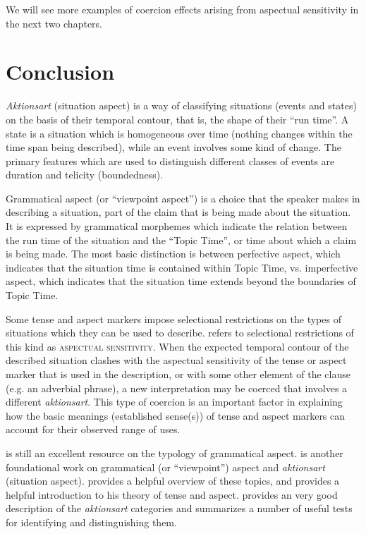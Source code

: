 We will see more examples of coercion effects arising from aspectual sensitivity in the next two chapters.


\section{Conclusion}\label{sec:20.7}

\textit{Aktionsart} (situation aspect) is a way of classifying situations (events and states) on the basis of their temporal contour, that is, the shape of their “run time”. A state is a situation which is homogeneous over time (nothing changes within the time span being described), while an event involves some kind of change. The primary features which are used to distinguish different classes of events are duration and telicity (boundedness).



Grammatical aspect (or “viewpoint aspect”) is a choice that the speaker makes in describing a situation, part of the claim that is being made about the situation. It is expressed by grammatical morphemes which indicate the relation between the run time of the situation and the “Topic Time”, or time about which a claim is being made. The most basic distinction is between perfective aspect, which indicates that the situation time is contained within Topic Time, vs. imperfective aspect, which indicates that the situation time extends beyond the boundaries of Topic Time.



Some tense and aspect markers impose selectional restrictions on the types of situations which they can be used to describe.  refers to selectional restrictions of this kind as \textsc{aspectual sensitivity}. When the expected temporal contour of the described situation clashes with the aspectual sensitivity of the tense or aspect marker that is used in the description, or with some other element of the clause (e.g. an adverbial phrase), a new interpretation may be coerced that involves a different \textit{aktionsart}. This type of coercion is an important factor in explaining how the basic meanings (established sense(s)) of tense and aspect markers can account for their observed range of uses.



\furtherreading



\citet{Comrie1976} is still an excellent resource on the typology of grammatical aspect. \citet{Smith1991/1997} is another foundational work on grammatical (or “viewpoint”) aspect and \textit{aktionsart} (situation aspect). \citet{Binnick2006} provides a helpful overview of these topics, and \citet{Klein2009} provides a helpful introduction to his theory of tense and aspect. \citet{Dowty1979} provides an very good description of the \textit{aktionsart} categories and summarizes a number of useful tests for identifying and distinguishing them.


